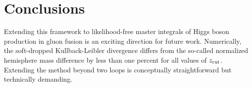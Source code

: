 \section{Conclusions}\label{sec:conclusions}

Extending this framework to likelihood-free master integrals of Higgs
boson production in gluon fusion is an exciting direction for future
work. Numerically, the soft-dropped Kullback-Leibler divergence differs
from the so-called normalized hemisphere mass difference by less than
one percent for all values of $z_{\rm cut}$. Extending the method beyond
two loops is conceptually straightforward but technically demanding.

